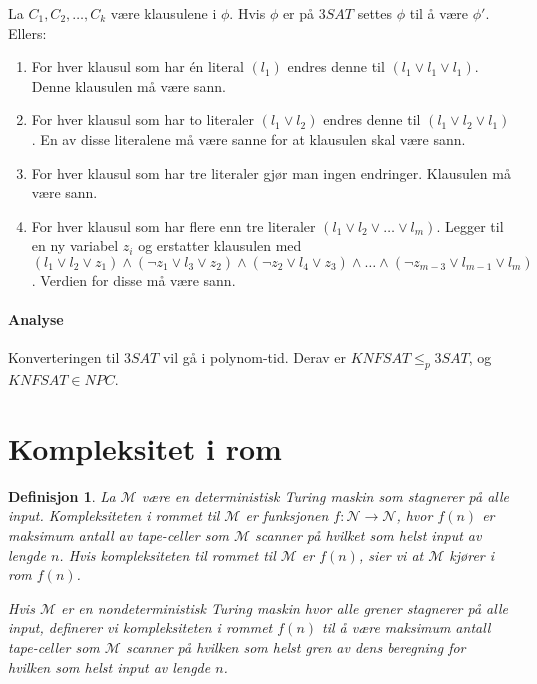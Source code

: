 \documentclass[11pt,a4paper]{article}
\begin{document}
La $C_1, C_2, \dots, C_k$ være klausulene i $\phi$. Hvis $\phi$ er på $3SAT$ settes $\phi$ til å være $\phi'$. Ellers:

\begin{enumerate}
\item{For hver klausul som har én literal $(l_1)$ endres denne til $(l_1 \vee l_1 \vee l_1)$}. Denne klausulen må være sann.
\item{For hver klausul som har to literaler $(l_1 \vee l_2)$ endres denne til $(l_1 \vee l_2 \vee l_1)$. En av disse literalene må være sanne for at klausulen skal være sann.}
\item{For hver klausul som har tre literaler gjør man ingen endringer. Klausulen må være sann.}
\item{For hver klausul som har flere enn tre literaler $(l_1 \vee l_2 \vee \dots \vee l_m)$. Legger til en ny variabel $z_i$ og erstatter klausulen med $(l_1 \vee l_2 \vee z_1) \wedge (\neg z_1 \vee l_3 \vee z_2) \wedge (\neg z_2 \vee l_4 \vee z_3) \wedge \dots \wedge (\neg z_{m-3} \vee l_{m-1} \vee l_m)$. Verdien for disse må være sann.}
\end{enumerate}
\paragraph{Analyse} Konverteringen til $3SAT$ vil gå i polynom-tid. Derav er $KNFSAT \leq_{p} 3SAT$, og $KNFSAT \in NPC$.

\section{Kompleksitet i rom}
\theoremstyle{mytheoremstyle}
\newtheorem{rom}{Definisjon}[section]
\begin{rom}
La $\mathcal{M}$ være en deterministisk Turing maskin som stagnerer på alle input. Kompleksiteten i rommet til $\mathcal{M}$ er funksjonen $f : \mathcal{N} \rightarrow \mathcal{N}$, hvor $f(n)$ er maksimum antall av tape-celler som $\mathcal{M}$ scanner på hvilket som helst input av lengde $n$. Hvis kompleksiteten til rommet til $\mathcal{M}$ er $f(n)$, sier vi at $\mathcal{M}$ kjører i rom $f(n)$.

Hvis $\mathcal{M}$ er en nondeterministisk Turing maskin hvor alle grener stagnerer på alle input, definerer vi kompleksiteten i rommet $f(n)$ til å være maksimum antall tape-celler som $\mathcal{M}$ scanner på hvilken som helst gren av dens beregning for hvilken som helst input av lengde $n$.
\end{rom}
\end{document}
